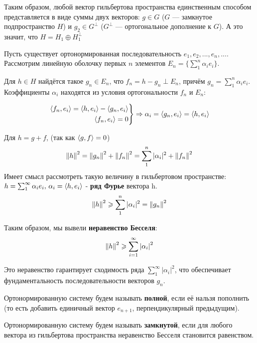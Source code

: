 \documentclass[12pt]{article}
\begin{document}
		Таким образом, любой вектор гильбертова пространства единственным
		способом представляется в виде суммы двух векторов:
		$g \in G$ ($G$ --- замкнутое подпространство $H$) и $g_2 \in G^\perp$ ($G^\perp$ --- ортогональное дополнение к $G$).
		А это значит, что $H = H_1 \oplus H_1^\perp$
	
		Пусть существует ортонормированная последовательность $e_1, e_2, ..., e_n, ...$. Рассмотрим линейную 
		оболочку первых $n$ элементов $E_n = \{ \sum_1^n \alpha_i e_i \}$.

		Для $h \in H$ найдётся такое $g_n \in E_n$, что $f_n = h - g_n \perp E_n$, причём 
		$g_n = \sum_1^n \alpha_i e_i$. Коэффициенты $\alpha_i$ находятся из условия ортогональности $f_n$ и $E_n$:

		$$
		    \left.
		    \begin{aligned}
		        \left\langle f_n, e_i \right\rangle = \left\langle h, e_i \right\rangle - \left\langle g_n, e_i \right\rangle \\
		        \left\langle f_n, e_i \right\rangle = 0
		    \end{aligned}
		    \right\} \Rightarrow \alpha_i = \left\langle g_n, e_i \right\rangle = \left\langle h, e_i \right\rangle
		$$

		Для $h = g + f$, (так как $\left\langle g, f \right\rangle = 0$)
		$$ \left\| h \right\|^2 = \left\| g_n \right\|^2 + \left\| f_n \right\|^2 = \sum_1^n |\alpha_i|^2 + \left\| f_n \right\|^2$$
		Имеет смысл рассмотреть такую величину в гильбертовом пространстве: 
		$h = \sum_1^{\infty} \alpha_i e_i,\, \alpha_i = \left\langle h, e_i \right\rangle$ -
		\textbf{ряд Фурье} вектора h.
		$$ \left\| h \right\|^2 \geqslant \sum_1^n |\alpha_i|^2 = \left\| g_n \right\|^2 $$

	
		Таким образом, мы вывели \textbf{неравенство Бесселя}:
		$$ \left\| h \right\|^2 \geqslant \sum_{i=1}^{\infty} \left| \alpha_i \right|^2 $$

		Это неравенство гарантирует сходимость ряда $\sum_1^{\infty} |\alpha_i|^2$, что обеспечивает фундаментальность 
		последовательности векторов $g_n$.
	
		\begin{defi}
			Ортонормированную систему будем называть \textbf{полной}, если её нальзя пополнить 
			(то есть добавить единичный вектор $e_{n+1}$, перпендикулярный предыдущим).
		\end{defi}
		\begin{defi}
			Ортонормированную систему будем называть \textbf{замкнутой}, если для любого вектора из 
			гильбертова пространства неравенство Бесселя становится равенством.
		\end{defi}
	
\end{document}

